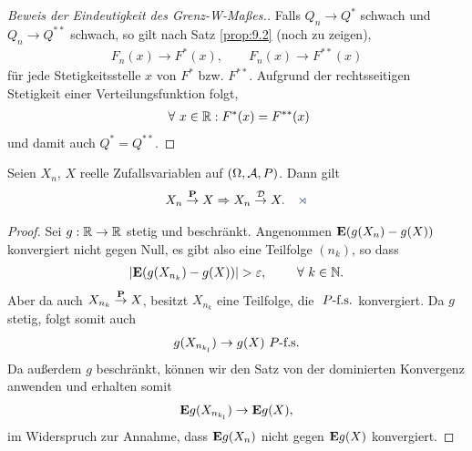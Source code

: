 \begin{proof}[Beweis der Eindeutigkeit
des Grenz-W-Maßes.]
Falls $Q_n\to Q^{*}$ schwach und $Q_n\to Q^{**}$ schwach, so gilt nach Satz
\ref{prop:9.2} (noch zu zeigen),
\begin{align*}
F_n(x) \to F^{*}(x),\qquad F_n(x)\to F^{**}(x)
\end{align*}
für jede Stetigkeitsstelle $x$ von $F^{*}$ bzw. $F^{**}$. Aufgrund der
rechtsseitigen Stetigkeit einer Verteilungsfunktion folgt,
\begin{align*}
\forall x\in \R : F^{*}(x) = F^{**}(x)
\end{align*} 
und damit auch $Q^{*}=Q^{**}$.\qedhere
\end{proof}

\begin{prop}
\label{prop:9.1}
Seien $X_{n}$, $X$ reelle Zufallsvariablen auf $(\Omega, {\AA}, P)$. Dann gilt
\begin{align*}
X_{n} \Pto X \Rightarrow X_{n}\Dto X.\fishhere
\end{align*}
\end{prop}
\begin{proof}
Sei $g: \R\to\R$ stetig und beschränkt. Angenommen $\E (g(X_n)-g(X))$
konvergiert nicht gegen Null, es gibt also eine Teilfolge $(n_k)$, so dass
\begin{align*}
\abs{\E (g(X_{n_k})-g(X))} > \ep,\qquad \forall k\in\N.
\end{align*}
Aber da auch $X_{n_k}\Pto X$, besitzt $X_{n_k}$ eine Teilfolge, die $\Pfs$
konvergiert. Da $g$ stetig, folgt somit auch
\begin{align*}
g(X_{n_{k_l}}) \to  g(X) \Pfs
\end{align*}
Da außerdem $g$ beschränkt, können wir den Satz von der dominierten Konvergenz
anwenden und erhalten somit
\begin{align*}
\E g(X_{n_{k_l}}) \to  \E g(X),
\end{align*}
im Widerspruch zur Annahme, dass $\E g(X_n)$ nicht gegen $\E g(X)$
konvergiert.\qedhere
\end{proof}

